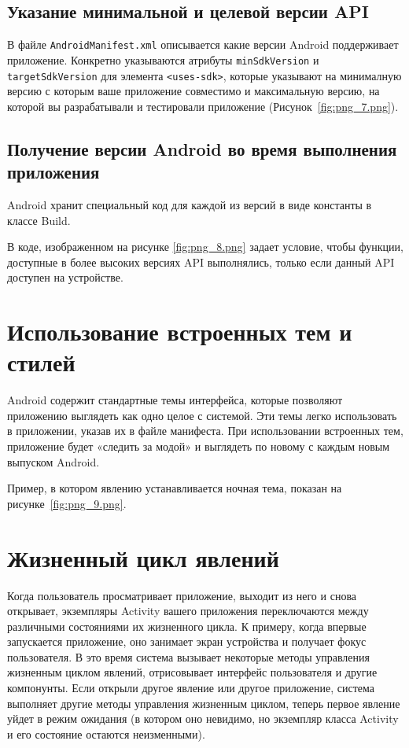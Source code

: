 \subsection{Указание минимальной и целевой версии API}
В файле \texttt{AndroidManifest.xml} описывается какие версии Android
поддерживает приложение. Конкретно указываются атрибуты
\texttt{minSdkVersion} и \texttt{targetSdkVersion} для
элемента \texttt{<uses-sdk>}, которые указывают на минималную версию
с которым ваше приложение совместимо и максимальную версию,
на которой вы разрабатывали и тестировали приложение
(Рисунок~\ref{fig:png_7.png}).

\subsection{Получение версии Android во время выполнения приложения}
Android хранит специальный код для каждой из версий в виде константы в
классе Build.\par
В коде, изображенном на рисунке \ref{fig:png_8.png} задает условие,
чтобы функции, доступные в более высоких версиях API выполнялись,
только если данный API доступен на устройстве.

\section{Использование встроенных тем и стилей}
Android содержит стандартные темы интерфейса, которые позволяют
приложению выглядеть как одно целое с системой. Эти темы легко
использовать в приложении, указав их в файле манифеста. При
использовании встроенных тем, приложение будет «следить за модой» и
выглядеть по новому с каждым новым выпуском Android.\par
Пример, в котором явлению устанавливается ночная тема,
показан на рисунке~\ref{fig:png_9.png}.


\section{Жизненный цикл явлений}
Когда пользователь просматривает приложение, выходит из него и снова
открывает, экземпляры Activity вашего приложения переключаются между
различными состояниями их жизненного цикла. К примеру, когда впервые
запускается приложение, оно занимает экран устройства и получает фокус
пользователя. В это время система вызывает некоторые методы управления
жизненным циклом явлений, отрисовывает интерфейс пользователя и другие
компонунты. Если открыли другое явление или другое приложение, система
выполняет другие методы управления жизненным циклом, теперь первое явление
уйдет в режим ожидания (в котором оно невидимо, но экземпляр класса
Activity и его состояние остаются неизменными).

